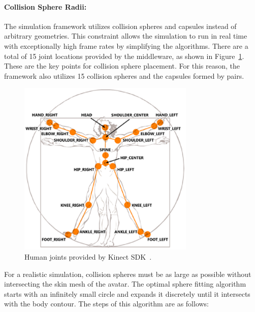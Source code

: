 \documentclass[number,preprint,review,12pt]{elsarticle}
\begin{document}
\paragraph{Collision Sphere Radii:}

The simulation framework utilizes collision spheres and capsules instead of arbitrary geometries. This constraint allows the simulation to run in real time with exceptionally high frame rates by simplifying the algorithms. There are a total of 15 joint locations provided by the middleware, as shown in Figure~\ref{fig:nite_joints}. These are the key points for collision sphere placement. For this reason, the framework also utilizes 15 collision spheres and the capsules formed by pairs.

\begin{figure}[htbp]
	\begin{center}
	\includegraphics[width=0.75\textwidth]{./figures/nite_joints.eps}
	\end{center}
	\caption{Human joints provided by Kinect SDK~\cite{CodeProject2011}.}
	\label{fig:nite_joints}
\end{figure}

For a realistic simulation, collision spheres must be as large as possible without intersecting the skin mesh of the avatar. The optimal sphere fitting algorithm starts with an infinitely small circle and expands it discretely until it intersects with the body contour. The steps of this algorithm are as follows:  
\end{document}
